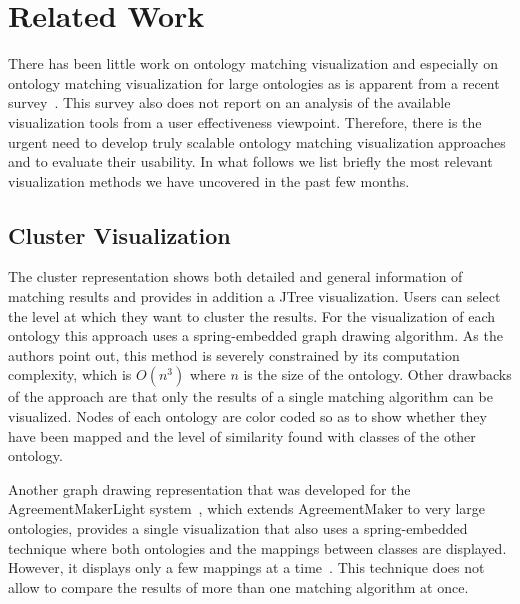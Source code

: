 \chapter{Related Work}
There has been little work on ontology matching visualization and especially on ontology matching visualization for large ontologies as is apparent from a recent survey~\cite{surveyLambrix}. This survey also does not report on an analysis of the available visualization tools from a user effectiveness viewpoint. Therefore, there is the urgent need to develop truly scalable ontology matching visualization approaches and to evaluate their usability. In what follows we list briefly the most relevant visualization methods we have uncovered in the past few months.

\section{Cluster Visualization} %
\label{sub:cluster_representation}
    The cluster representation \cite{Lanzenberger06alviz-} shows both detailed and general information of matching results and provides in addition a JTree visualization. Users can select the level at which they want to cluster the results. For the visualization of each ontology this approach uses a spring-embedded graph drawing algorithm. As the authors point out, this method is severely constrained by its computation complexity, which is $O(n^3)$ where $n$ is the size of the ontology. Other drawbacks of the approach are that only the results of a single matching algorithm can be visualized. %
Nodes of each ontology are color coded so as to show whether they have been mapped and the level of similarity found with classes of the other ontology. 

Another graph drawing representation that was developed for the AgreementMakerLight system~\cite{faria2013agreementmakerlight}, which extends AgreementMaker to very large ontologies, provides a single visualization that also uses a spring-embedded technique where both ontologies and the mappings between classes are displayed. However, it displays only a few mappings at a time~\cite{PesquitaVisualization2014}. This technique does not allow to compare the results of more than one matching algorithm at once.
